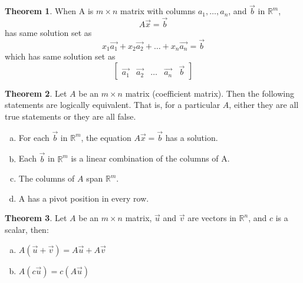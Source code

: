 \documentclass[a4paper,12pt]{article}
\theoremstyle{definition}
\newtheorem{theorem}{Theorem}
\theoremstyle{definition}
\begin{document}
	\begin{theorem}
		\label{thm:A-x-b-thm}
		When A is $m \times n$ matrix with columns $a_1,\ldots,a_n$, and $\vec{b}$ in $\mathbb{R}^m$,
		\begin{equation*}
			A\vec{x} = \vec{b}
		\end{equation*}
		has same solution set as
		\begin{equation*}
			x_1\vec{a_1} + x_2\vec{a_2} + \ldots + x_n\vec{a_n} = \vec{b}
		\end{equation*}
		which has same solution set as 
		\begin{equation*}
			\begin{bmatrix}
				\vec{a_1} & \vec{a_2} & \ldots & \vec{a_n} & \vec{b}
			\end{bmatrix}
		\end{equation*}
	\end{theorem}
	
	\begin{theorem}
		\label{thm:A-x-b-relation-thm}
		Let $A$ be an $m \times n$ matrix (coefficient matrix). Then the following statements are logically equivalent.
		That is, for a particular $A$, either they are all true statements or they are all false.
		\begin{enumerate}[a.]
			\item For each $\vec{b}$ in $\mathbb{R} ^ m$, the equation $A\vec{x} = \vec{b}$ has a solution.
			
			\item Each $\vec{b}$ in $\mathbb{R} ^ m$ is a linear combination of the columns of A.
			
			\item The columns of $A$ span $\mathbb{R} ^ m$.
			
			\item A has a pivot position in every row.
		\end{enumerate}
	\end{theorem}
	
	\begin{theorem}
		\label{thm:A-x-b-props}
		Let $A$ be an $m \times n$ matrix, $\vec{u}$ and $\vec{v}$ are vectors in $\mathbb{R}^n$, and $c$ is a scalar, then:
		
		\begin{enumerate}[a.]
			\item $A(\vec{u} + \vec{v}) = A\vec{u} + A\vec{v}$
			
			\item $A(c\vec{u}) = c(A\vec{u})$
		\end{enumerate}
	\end{theorem}
	\newpage
	
\end{document}
